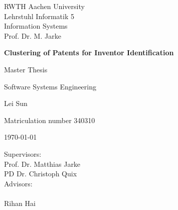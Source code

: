 \thispagestyle{empty}


 \begin{center}
  \parbox{5.5cm}{
 \centering
 RWTH Aachen University \\
  Lehrstuhl Informatik 5 \\
  Information Systems \\
  Prof. Dr. M. Jarke}
 \end{center}



\vspace*{3cm}
\centerline{{\Large\bf Clustering of Patents for Inventor Identification}}

\vspace*{4mm}

\vspace{2cm}


\centerline{Master Thesis}
\centerline{Software Systems Engineering}

\vspace{2cm}

\centerline{{\large Lei Sun}}
\centerline{Matriculation number 340310}

\vspace{10mm}

\centerline{\today}

\vspace{10mm}

\begin{center}
\begin{minipage}[t]{8cm}
Supervisors: \\
\hspace*{2cm} Prof. Dr. Matthias Jarke \\
\hspace*{2cm} PD Dr. Christoph Quix\\[1cm]
Advisors: \\
\hspace*{2cm}  \\
\hspace*{2cm}Rihan Hai\\

\end{minipage}
\end{center}
